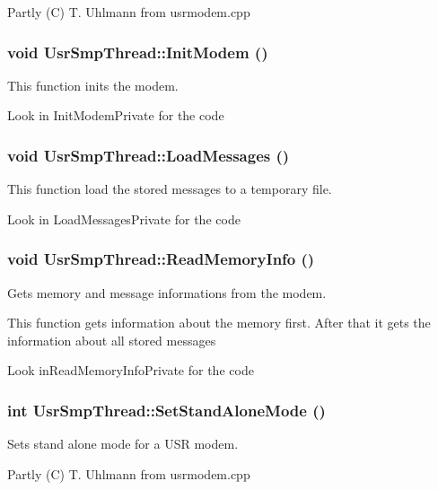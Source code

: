 Partly (C) T. Uhlmann from usrmodem.cpp 
\subsubsection{\setlength{\rightskip}{0pt plus 5cm}void Usr\-Smp\-Thread::Init\-Modem ()}\label{classUsrSmpThread_a2}


This function inits the modem. 

Look in Init\-Modem\-Private for the code 
\subsubsection{\setlength{\rightskip}{0pt plus 5cm}void Usr\-Smp\-Thread::Load\-Messages ()}\label{classUsrSmpThread_a5}


This function load the stored messages to a temporary file. 

Look in Load\-Messages\-Private for the code 
\subsubsection{\setlength{\rightskip}{0pt plus 5cm}void Usr\-Smp\-Thread::Read\-Memory\-Info ()}\label{classUsrSmpThread_a3}


Gets memory and message informations from the modem. 

This function gets information about the memory first. After that it gets the information about all stored messages

Look in\-Read\-Memory\-Info\-Private for the code 
\subsubsection{\setlength{\rightskip}{0pt plus 5cm}int Usr\-Smp\-Thread::Set\-Stand\-Alone\-Mode ()}\label{classUsrSmpThread_a15}


Sets stand alone mode for a USR modem. 

Partly (C) T. Uhlmann from usrmodem.cpp 
